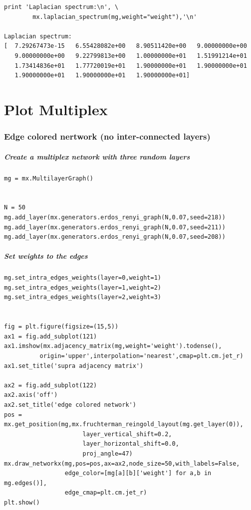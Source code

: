 \documentclass[]{article}
\begin{document}
\begin{verbatim}
print 'Laplacian spectrum:\n', \
        mx.laplacian_spectrum(mg,weight="weight"),'\n'

Laplacian spectrum:
[  7.29267473e-15   6.55428082e+00   8.90511420e+00   9.00000000e+00
   9.00000000e+00   9.22799813e+00   1.00000000e+01   1.51991214e+01
   1.73414836e+01   1.77720019e+01   1.90000000e+01   1.90000000e+01
   1.90000000e+01   1.90000000e+01   1.90000000e+01] 
\end{verbatim}

\section{Plot Multiplex}\label{plot-multiplex}

\subsubsection{Edge colored nertwork (no inter-connected
layers)}\label{edge-colored-nertwork-no-inter-connected-layers}

\subparagraph{Create a multiplex network with three random
layers}\label{create-a-multiplex-network-with-three-random-layers}

\begin{verbatim}
mg = mx.MultilayerGraph()


N = 50
mg.add_layer(mx.generators.erdos_renyi_graph(N,0.07,seed=218))
mg.add_layer(mx.generators.erdos_renyi_graph(N,0.07,seed=211))
mg.add_layer(mx.generators.erdos_renyi_graph(N,0.07,seed=208))
\end{verbatim}

\subparagraph{Set weights to the edges}\label{set-weights-to-the-edges}

\begin{verbatim}
mg.set_intra_edges_weights(layer=0,weight=1)
mg.set_intra_edges_weights(layer=1,weight=2)
mg.set_intra_edges_weights(layer=2,weight=3)


fig = plt.figure(figsize=(15,5))
ax1 = fig.add_subplot(121)
ax1.imshow(mx.adjacency_matrix(mg,weight='weight').todense(),
          origin='upper',interpolation='nearest',cmap=plt.cm.jet_r)
ax1.set_title('supra adjacency matrix')

ax2 = fig.add_subplot(122)
ax2.axis('off')
ax2.set_title('edge colored network')
pos = mx.get_position(mg,mx.fruchterman_reingold_layout(mg.get_layer(0)),
                      layer_vertical_shift=0.2,
                      layer_horizontal_shift=0.0,
                      proj_angle=47)
mx.draw_networkx(mg,pos=pos,ax=ax2,node_size=50,with_labels=False,
                 edge_color=[mg[a][b]['weight'] for a,b in mg.edges()],
                 edge_cmap=plt.cm.jet_r)
plt.show()
\end{verbatim}
\end{document}
